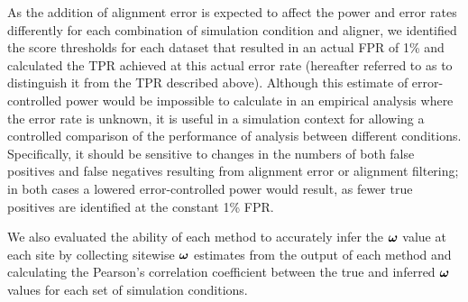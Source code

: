 \documentclass{article}
\begin{document}
As the addition of alignment error is expected to affect the power and
error rates differently for each combination of simulation condition
and aligner, we identified the score thresholds for each dataset that
resulted in an actual FPR of 1\% and calculated the TPR achieved at
this actual error rate (hereafter referred to as \tpr{} to distinguish
it from the TPR described above). Although this estimate of
error-controlled power would be impossible to calculate in an
empirical analysis where the error rate is unknown, it is useful in a
simulation context for allowing a controlled comparison of the
performance of \sw analysis between different
conditions. Specifically, it should be sensitive to changes in the
numbers of both false positives and false negatives resulting from
alignment error or alignment filtering; in both cases a lowered
error-controlled power would result, as fewer true positives are
identified at the constant 1\% FPR.

We also evaluated the ability of each method to accurately infer the
$\bm{\omega}$ value at each site by collecting sitewise $\bm{\omega}$ estimates from
the output of each method and calculating the Pearson's correlation
coefficient between the true and inferred $\bm{\omega}$ values for each set
of simulation conditions.
\end{document}
